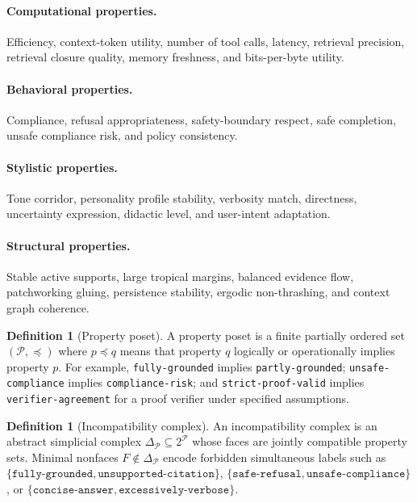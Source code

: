 \documentclass[11pt]{article}
\theoremstyle{definition}
\newtheorem{definition}[theorem]{Definition}
\theoremstyle{remark}
\newcommand{\Prop}{\mathcal{P}}
\numberwithin{equation}{section}
\begin{document}
\paragraph{Computational properties.} Efficiency, context-token utility, number of tool calls, latency, retrieval precision, retrieval closure quality, memory freshness, and bits-per-byte utility.

\paragraph{Behavioral properties.} Compliance, refusal appropriateness, safety-boundary respect, safe completion, unsafe compliance risk, and policy consistency.

\paragraph{Stylistic properties.} Tone corridor, personality profile stability, verbosity match, directness, uncertainty expression, didactic level, and user-intent adaptation.

\paragraph{Structural properties.} Stable active supports, large tropical margins, balanced evidence flow, patchworking gluing, persistence stability, ergodic non-thrashing, and context graph coherence.

\begin{definition}[Property poset]
A property poset is a finite partially ordered set \((\Prop,\preceq)\) where \(p\preceq q\) means that property \(q\) logically or operationally implies property \(p\).  For example, \texttt{fully-grounded} implies \texttt{partly-grounded}; \texttt{unsafe-compliance} implies \texttt{compliance-risk}; and \texttt{strict-proof-valid} implies \texttt{verifier-agreement} for a proof verifier under specified assumptions.
\end{definition}

\begin{definition}[Incompatibility complex]
An incompatibility complex is an abstract simplicial complex \(\Delta_{\Prop}\subseteq 2^\Prop\) whose faces are jointly compatible property sets.  Minimal nonfaces \(F\notin\Delta_{\Prop}\) encode forbidden simultaneous labels such as \(\{\texttt{fully-grounded},\texttt{unsupported-citation}\}\), \(\{\texttt{safe-refusal},\texttt{unsafe-compliance}\}\), or \(\{\texttt{concise-answer},\texttt{excessively-verbose}\}\).
\end{definition}
\end{document}
